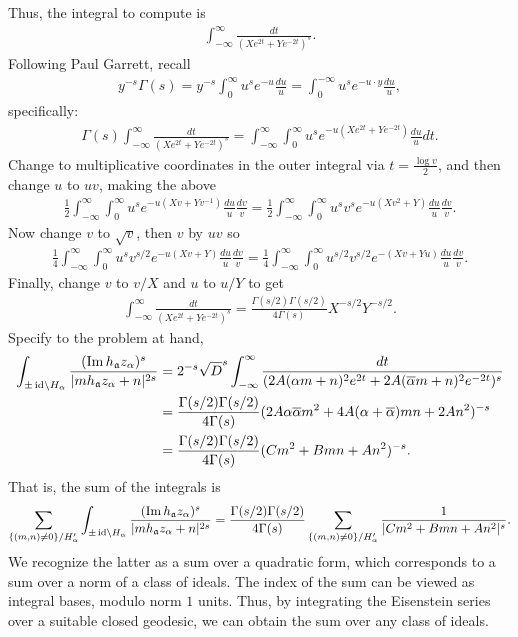 \documentclass[11pt]{amsart}
\begin{document}
Thus, the integral to compute is 
\begin{align*}
\int_{-\infty}^{\infty} \frac{dt}{(X e^{2t}+Y e^{-2t})^s}.
\end{align*}
Following Paul Garrett, recall 
\begin{align*}
y^{-s}\Gamma(s) =y^{-s} \int_{0} ^{\infty} u^s e^{-u} \frac{du}{u} =\int_{0} ^{-\infty} u^s e^{-u \cdot y} \frac{du}{u},
\end{align*}
specifically:
\begin{align*}
\Gamma(s)\int_{-\infty}^{\infty} \frac{dt}{(Xe^{2t}+Ye^{-2t})^s}=\int_{-\infty}^{\infty} \int_0 ^{\infty} u^s e^{-u(Xe^{2t}+Ye^{-2t})} \frac{du}{u} dt.
\end{align*}
Change to multiplicative coordinates in the outer integral via $t=\frac{\log v}{2}$, and then change $u$ to $uv$, making the above
\begin{align*}
\frac{1}{2} \int_{-\infty}^{\infty} \int_0 ^{\infty} u^s e^{-u(Xv+Yv^{-1})} \frac{du}{u} \frac{dv}{v} = \frac{1}{2} \int_{-\infty}^{\infty} \int_0 ^{\infty} u^s v^s e^{-u(Xv^2+Y)} \frac{du}{u} \frac{dv}{v}.
\end{align*}
Now change $v$ to $\sqrt{v}$, then $v$ by $uv$ so 
\begin{align*}
\frac{1}{4} \int_{-\infty}^{\infty} \int_0 ^{\infty} u^s v^{s/2} e^{-u(Xv+Y)} \frac{du}{u} \frac{dv}{v}= \frac{1}{4} \int_{-\infty}^{\infty} \int_0 ^{\infty} u^{s/2} v^{s/2} e^{-(Xv+Yu)} \frac{du}{u} \frac{dv}{v}.
\end{align*}
Finally, change $v$ to $v/X$ and $u$ to $u/Y$ to get
\begin{align*}
\int_{-\infty}^{\infty} \frac{dt}{(Xe^{2t}+Ye^{-2t})^s}=\frac{\Gamma(s/2)\Gamma(s/2)}{4 \Gamma(s)}X^{-s/2}Y^{-s/2}.
\end{align*}
Specify to the problem at hand,
\begin{align*}
\int_{ {\pm \operatorname{id}} \backslash H_\alpha} \frac{(\operatorname{Im} h_{\mathfrak{a}} z_\alpha)^{s}}{|m h_{\mathfrak{a}} z_\alpha+n|^{2s}}& =2^{-s}\sqrt{D}^s\int_{-\infty}^{\infty} \frac{dt}{( 2A(\alpha m +n)^2e^{2t}+2A(\overline{\alpha} m +n)^2e^{-2t})^s} \\
&= \frac{\Gamma(s/2)\Gamma(s/2)}{4 \Gamma(s)}(2A\alpha\overline{\alpha} m^2 +4A (\alpha + \overline{\alpha})mn +2A n^2)^{-s} \\
&= \frac{\Gamma(s/2)\Gamma(s/2)}{4 \Gamma(s)}(C m^2 +B m n + A n^2)^{-s}.
\end{align*}
That is, the sum of the integrals is
\begin{align*}
\sum_{\{ (m,n)\neq 0 \}/ H'_\alpha} \int_{ {\pm \operatorname{id}} \backslash H_\alpha} \frac{(\operatorname{Im} h_{\mathfrak{a}} z_\alpha)^{s}}{|m h_{\mathfrak{a}} z_\alpha+n|^{2s}} =   \frac{\Gamma(s/2)\Gamma(s/2)}{4 \Gamma(s)} \sum_{\{ (m,n)\neq 0 \}/ H'_\alpha}\frac{1}{|C m^2 +B m n + A n^2|^{s}}.
\end{align*}
We recognize the latter as a sum over a quadratic form, which corresponds to a sum over a norm of a class of ideals. The index of the sum can be viewed as integral bases, modulo norm $1$ units. Thus, by integrating the Eisenstein series over a suitable closed geodesic, we can obtain the sum over any class of ideals.
\end{document}
